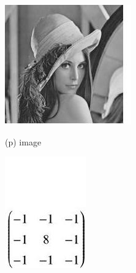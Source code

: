 \documentclass[10pt]{article}
\begin{document}
\includegraphics[max width=\textwidth]{2022_01_06_b5ce182ed1bd5f482e5bg-16(1)}

(p) image

\includegraphics[max width=\textwidth]{2022_01_06_b5ce182ed1bd5f482e5bg-16(2)}
\end{document}
